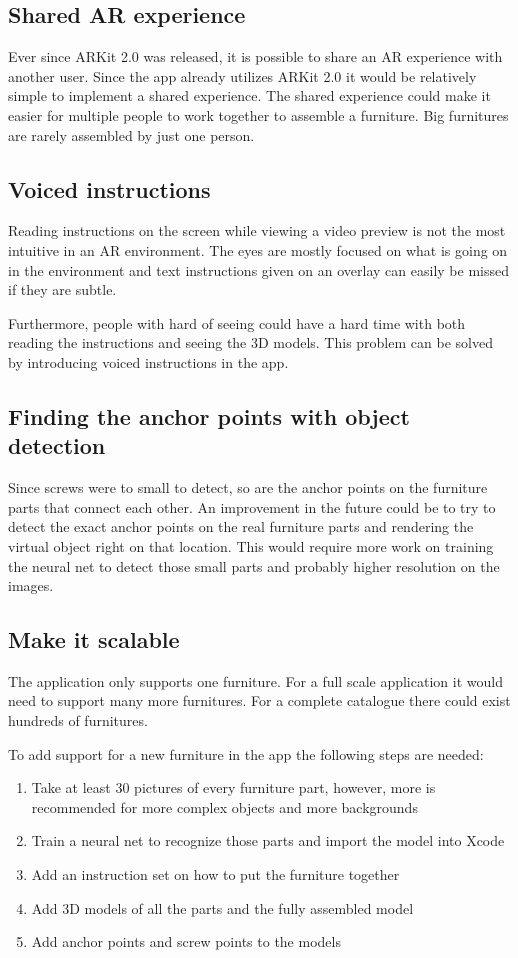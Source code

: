 \subsection{Shared AR experience}
Ever since ARKit 2.0 was released, it is possible to share an AR experience with another user.
Since the app already utilizes ARKit 2.0 it would be relatively simple to implement a shared 
experience. The shared experience could make it easier for multiple people to work together to
assemble a furniture. Big furnitures are rarely assembled by just one person.

\subsection{Voiced instructions}
Reading instructions on the screen while viewing a video preview is not the most intuitive in an
AR environment. The eyes are mostly focused on what is going on in the environment and text
instructions given on an overlay can easily be missed if they are subtle.

Furthermore, people with hard of seeing could have a hard time with both reading the instructions
and seeing the 3D models. This problem can be solved by introducing voiced instructions in the app.

\subsection{Finding the anchor points with object detection}
Since screws were to small to detect, so are the anchor points on the furniture parts that connect
each other.
An improvement in the future could be to try to detect the exact anchor points on the
real furniture parts and rendering the virtual object right on that location. This would
require more work on training the neural net to detect those small parts and probably
higher resolution on the images.

\subsection{Make it scalable}
The application only supports one furniture. For a full scale application it would need to support
many more furnitures. For a complete catalogue there could exist hundreds of furnitures.

To add support for a new furniture in the app the following steps are needed:

\begin{enumerate}
\item Take at least 30 pictures of every furniture part, however, more is recommended for more complex objects and more backgrounds
\item Train a neural net to recognize those parts and import the model into Xcode
\item Add an instruction set on how to put the furniture together
\item Add 3D models of all the parts and the fully assembled model
\item Add anchor points and screw points to the models
\end{enumerate}


